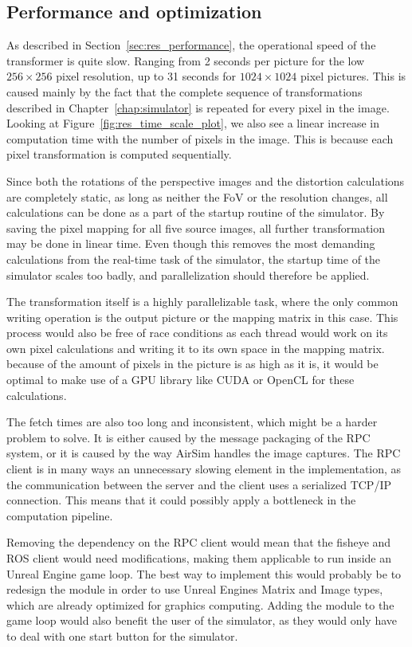 \subsection{Performance and optimization} \label{sec:disc_performance}

As described in Section~\ref{sec:res_performance}, the operational speed of the transformer is quite slow. Ranging from 2 seconds per picture for the low $256\times 256$ pixel resolution, up to 31 seconds for $1024 \times 1024$ pixel pictures. This is caused mainly by the fact that the complete sequence of transformations described in Chapter~\ref{chap:simulator} is repeated for every pixel in the image. Looking at Figure~\ref{fig:res_time_scale_plot}, we also see a linear increase in computation time with the number of pixels in the image. This is because each pixel transformation is computed sequentially.

Since both the rotations of the perspective images and the distortion calculations are completely static, as long as neither the FoV or the resolution changes, all calculations can be done as a part of the startup routine of the simulator. By saving the pixel mapping for all five source images, all further transformation may be done in linear time. Even though this removes the most demanding calculations from the real-time task of the simulator, the startup time of the simulator scales too badly, and parallelization should therefore be applied.

The transformation itself is a highly parallelizable task, where the only common writing operation is the output picture or the mapping matrix in this case. This process would also be free of race conditions as each thread would work on its own pixel calculations and writing it to its own space in the mapping matrix. because of the amount of pixels in the picture is as high as it is, it would be optimal to make use of a GPU library like CUDA or OpenCL for these calculations.

The fetch times are also too long and inconsistent, which might be a harder problem to solve. It is either caused by the message packaging of the RPC system, or it is caused by the way AirSim handles the image captures. The RPC client is in many ways an unnecessary slowing element in the implementation, as the communication between the server and the client uses a serialized TCP/IP connection. This means that it could possibly apply a bottleneck in the computation pipeline.

Removing the dependency on the RPC client would mean that the fisheye and ROS client would need modifications, making them applicable to run inside an Unreal Engine game loop. The best way to implement this would probably be to redesign the module in order to use Unreal Engines Matrix and Image types, which are already optimized for graphics computing. Adding the module to the game loop would also benefit the user of the simulator, as they would only have to deal with one start button for the simulator. 


\cleardoublepage